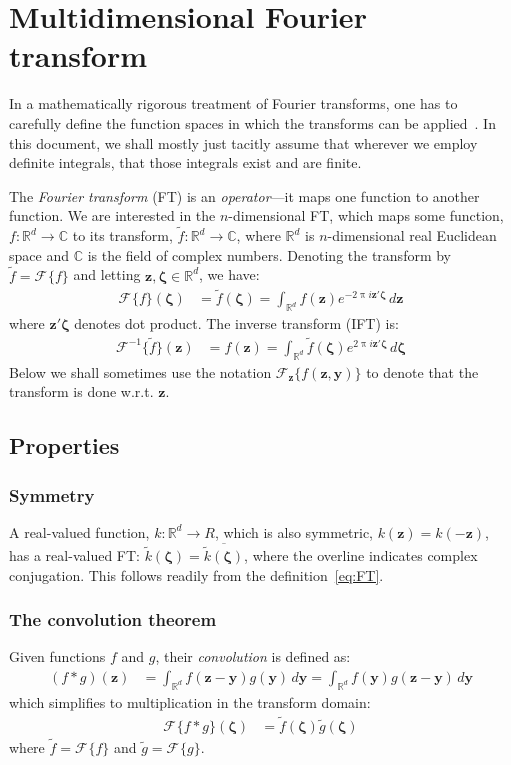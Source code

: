 \documentclass[a4paper,oneside,12pt,english]{report}
\def\zvec{\mathbf{z}}
\def\R{\mathbb{R}}
\def\yvec{\mathbf{y}}
\def\funcdef#1#2#3{#1:#2\to#3}
\def\Fset{\mathcal{F}}
\def\C{\mathbb{C}}
\newcommand\FT[2][]{\Fset_{#1}\{#2\}}
\def\IFT#1{\Fset^{-1}\{#1\}}
\def\conj#1{\overline{#1}}
\begin{document}
\chapter{Multidimensional Fourier transform}
\label{chap:MDFT}
\def\zetavec{\boldsymbol{\zeta}}
In a mathematically rigorous treatment of Fourier transforms, one has to carefully define the function spaces in which the transforms can be applied~\cite{SteinWeiss}. In this document, we shall mostly just tacitly assume that wherever we employ definite integrals, that those integrals exist and are finite.

The \emph{Fourier transform} (FT) is an \emph{operator}---it maps one function to another function. We are interested in the $n$-dimensional FT, which maps some function, $\funcdef{f}{\R^d}{\C}$ to its transform, $\funcdef{\tilde f}{\R^d}{\C}$, where $\R^d$ is $n$-dimensional real Euclidean space and $\C$ is the field of complex numbers. Denoting the transform by $\tilde f = \FT{f}$ and letting $\zvec,\zetavec\in\R^d$, we have:
\begin{align}
\label{eq:FT}
\FT{f}(\zetavec) &= \tilde f(\zetavec) = \int_{\R^d} f(\zvec)e^{-2\uppi i\zvec'\zetavec}\,d\zvec
\end{align}
where $\zvec'\zetavec$ denotes dot product. The inverse transform (IFT) is:
\begin{align}
\IFT{\tilde f}(\zvec) &= f(\zvec) = \int_{\R^d} \tilde f(\zetavec)e^{2\uppi i\zvec'\zetavec}\,d\zetavec
\end{align}
Below we shall sometimes use the notation $\FT[\zvec]{f(\zvec,\yvec)}$ to denote that the transform is done w.r.t. $\zvec$.

\section{Properties}

\subsection{Symmetry}
A real-valued function, $\funcdef{k}{\R^d}{R}$, which is also symmetric, $k(\zvec)=k(-\zvec)$, has a real-valued FT: $\tilde k(\zetavec) = \conj{\tilde k(\zetavec)}$, where the overline indicates complex conjugation. This follows readily from the definition~\eqref{eq:FT}.

\subsection{The convolution theorem}
Given functions $f$ and $g$, their \emph{convolution} is defined as:
\begin{align}
(f\ast g)(\zvec) &= \int_{\R^d} f(\zvec-\yvec)g(\yvec)\,d\yvec
= \int_{\R^d} f(\yvec)g(\zvec-\yvec)\,d\yvec
\end{align}
which simplifies to multiplication in the transform domain:
\begin{align}
\FT{f\ast g}(\zetavec) &= \tilde f(\zetavec)\tilde g(\zetavec)
\end{align}
where $\tilde f=\FT{f}$ and $\tilde g=\FT{g}$.
\end{document}
